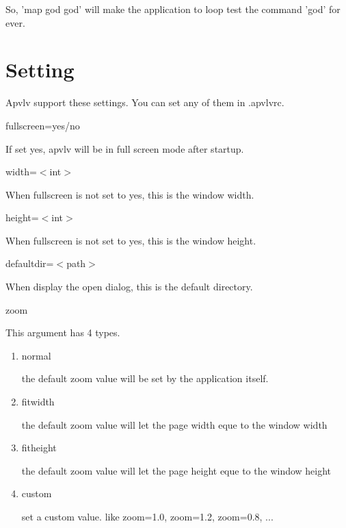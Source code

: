 \documentclass[a4paper,12pt]{article}
\begin{document}
So, 'map god god' will make the application to loop test the command 'god' for ever.

\newpage

\section{Setting}

Apvlv support these settings. You can set any of them in .apvlvrc.

\begin{description}

\item fullscreen=yes/no

If set yes, apvlv will be in full screen mode after startup.

\item width=$<$int$>$

When fullscreen is not set to yes, this is the window width.

\item height=$<$int$>$

When fullscreen is not set to yes, this is the window height.

\item defaultdir=$<$path$>$

When display the open dialog, this is the default directory.

\item zoom

This argument has 4 types.

\begin{enumerate}

\item normal

the default zoom value will be set by the application itself.

\item fitwidth

the default zoom value will let the page width eque to the window width

\item fitheight

the default zoom value will let the page height eque to the window height

\item custom

set a custom value. like zoom=1.0, zoom=1.2, zoom=0.8, ...

\end{enumerate}


\end{description}
\end{document}

